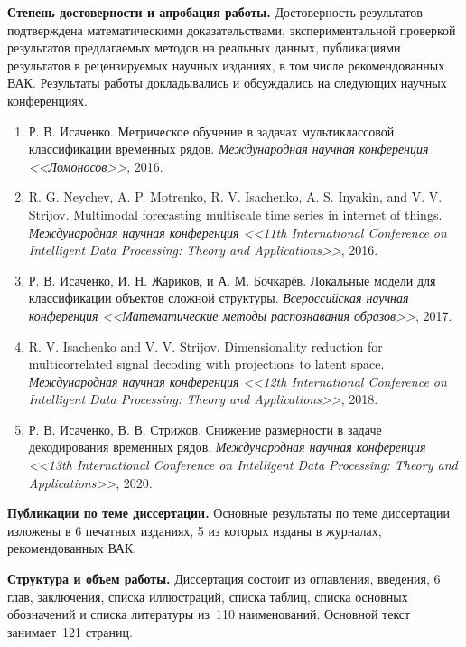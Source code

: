 \documentclass[11pt, a5paper]{dissert}
\begin{document}
\vspace{0.5cm}
\textbf{Степень достоверности и апробация работы.}
Достоверность результатов подтверждена математическими доказательствами, экспериментальной проверкой результатов предлагаемых методов на реальных данных, публикациями результатов в рецензируемых научных изданиях, в том числе рекомендованных ВАК. 
Результаты работы докладывались и обсуждались на следующих научных конференциях.
\vspace{0.2cm}
\begin{enumerate}
	\item Р. В. Исаченко. Метрическое обучение в задачах мультиклассовой классификации временных рядов. \textit{Международная научная конференция <<Ломоносов>>}, 2016.
	\item R. G. Neychev, A. P. Motrenko, R. V. Isachenko, A. S. Inyakin, and V. V. Strijov. Multimodal forecasting multiscale time series in internet of things. \textit{Международная научная конференция  <<11th International Conference on Intelligent Data Processing: Theory and Applications>>}, 2016.
	\item Р. В. Исаченко, И. Н. Жариков, и А. М. Бочкарёв. Локальные модели для классификации объектов сложной структуры. \textit{Всероссийская научная конференция <<Математические методы распознавания образов>>}, 2017.
	\item R. V. Isachenko and V. V. Strijov. Dimensionality reduction for multicorrelated signal decoding with projections to latent space. \textit{Международная научная конференция  <<12th International Conference on Intelligent Data Processing: Theory and Applications>>}, 2018.
	\item Р. В. Исаченко, В. В. Стрижов. Снижение размерности в задаче декодирования временных рядов. \textit{Международная научная конференция  <<13th International Conference on Intelligent Data Processing: Theory and Applications>>}, 2020.
\end{enumerate} 

\vspace{0.5cm}
\textbf{Публикации по теме диссертации.}
Основные результаты по теме диссертации изложены в 6 печатных изданиях, 5 из которых изданы в журналах, рекомендованных ВАК.

\vspace{0.5cm}
\textbf{Структура и объем работы.}
Диссертация состоит из оглавления, введения, 6 глав, заключения, списка иллюстраций, списка таблиц, списка основных обозначений и списка литературы из~110 наименований. 
Основной текст занимает~121 страниц.
\end{document}
